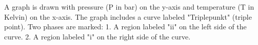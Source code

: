 A graph is drawn with pressure (P in bar) on the y-axis and temperature (T in Kelvin) on the x-axis. The graph includes a curve labeled "Triplepunkt" (triple point). Two phases are marked:  
1. A region labeled "ii" on the left side of the curve.  
2. A region labeled "i" on the right side of the curve.